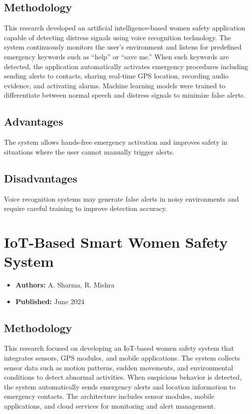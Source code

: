 \documentclass[a4paper,12pt]{report}
\begin{document}
\subsection{Methodology}
\par This research developed an artificial intelligence-based women safety application capable of detecting distress signals using voice recognition technology. The system continuously monitors the user’s environment and listens for predefined emergency keywords such as “help” or “save me.” When such keywords are detected, the application automatically activates emergency procedures including sending alerts to contacts, sharing real-time GPS location, recording audio evidence, and activating alarms. Machine learning models were trained to differentiate between normal speech and distress signals to minimize false alerts.

\subsection{Advantages}
\par The system allows hands-free emergency activation and improves safety in situations where the user cannot manually trigger alerts.
\subsection{Disadvantages}
\par Voice recognition systems may generate false alerts in noisy environments and require careful training to improve detection accuracy.

\section{IoT-Based Smart Women Safety System}
\begin{itemize}
    \item \textbf{Authors:} A. Sharma, R. Mishra
    \item \textbf{Published:} June 2024
\end{itemize}

\subsection{Methodology}
\par This research focused on developing an IoT-based women safety system that integrates sensors, GPS modules, and mobile applications. The system collects sensor data such as motion patterns, sudden movements, and environmental conditions to detect abnormal activities. When suspicious behavior is detected, the system automatically sends emergency alerts and location information to emergency contacts. The architecture includes sensor modules, mobile applications, and cloud services for monitoring and alert management.
\end{document}
